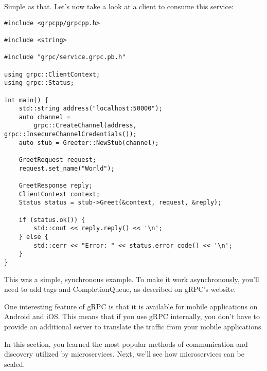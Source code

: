 Simple as that. Let's now take a look at a client to consume this service:

\begin{lstlisting}[style=styleCXX]
#include <grpcpp/grpcpp.h>

#include <string>

#include "grpc/service.grpc.pb.h"

using grpc::ClientContext;
using grpc::Status;

int main() {
	std::string address("localhost:50000");
	auto channel =
		grpc::CreateChannel(address, grpc::InsecureChannelCredentials());
	auto stub = Greeter::NewStub(channel);
	
	GreetRequest request;
	request.set_name("World");
	
	GreetResponse reply;
	ClientContext context;
	Status status = stub->Greet(&context, request, &reply);
	
	if (status.ok()) {
		std::cout << reply.reply() << '\n';
	} else {
		std::cerr << "Error: " << status.error_code() << '\n';
	}
}
\end{lstlisting}

This was a simple, synchronous example. To make it work asynchronously, you'll need to add tags and CompletionQueue, as described on gRPC's website.

One interesting feature of gRPC is that it is available for mobile applications on Android and iOS. This means that if you use gRPC internally, you don't have to provide an additional server to translate the traffic from your mobile applications.

In this section, you learned the most popular methods of communication and discovery utilized by microservices. Next, we'll see how microservices can be scaled. 




